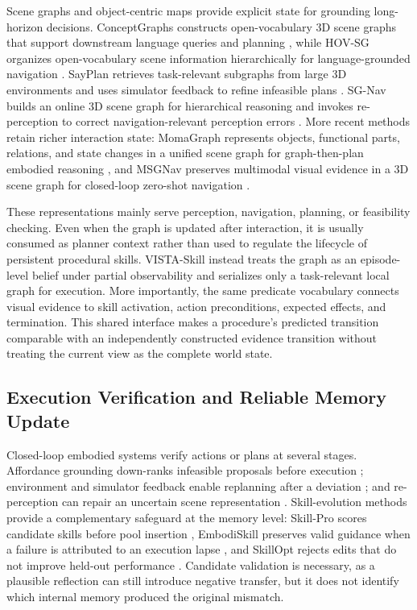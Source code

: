Scene graphs and object-centric maps provide explicit state for grounding long-horizon decisions. ConceptGraphs constructs open-vocabulary 3D scene graphs that support downstream language queries and planning \cite{guConceptGraphsOpenVocabulary3D2024}, while HOV-SG organizes open-vocabulary scene information hierarchically for language-grounded navigation \cite{werbyHierarchicalOpenVocabulary3D2024}. SayPlan retrieves task-relevant subgraphs from large 3D environments and uses simulator feedback to refine infeasible plans \cite{ranaSayPlanGroundingLarge2023}. SG-Nav builds an online 3D scene graph for hierarchical reasoning and invokes re-perception to correct navigation-relevant perception errors \cite{yinSGNavOnline3D2024}. More recent methods retain richer interaction state: MomaGraph represents objects, functional parts, relations, and state changes in a unified scene graph for graph-then-plan embodied reasoning \cite{juMomaGraphStateAwareUnified2026}, and MSGNav preserves multimodal visual evidence in a 3D scene graph for closed-loop zero-shot navigation \cite{huangMSGNavUnleashingPower2026}.

These representations mainly serve perception, navigation, planning, or feasibility checking. Even when the graph is updated after interaction, it is usually consumed as planner context rather than used to regulate the lifecycle of persistent procedural skills. VISTA-Skill instead treats the graph as an episode-level belief under partial observability and serializes only a task-relevant local graph for execution. More importantly, the same predicate vocabulary connects visual evidence to skill activation, action preconditions, expected effects, and termination. This shared interface makes a procedure's predicted transition comparable with an independently constructed evidence transition without treating the current view as the complete world state.

\subsection{Execution Verification and Reliable Memory Update}

Closed-loop embodied systems verify actions or plans at several stages. Affordance grounding down-ranks infeasible proposals before execution \cite{ichterCanNotSay2023}; environment and simulator feedback enable replanning after a deviation \cite{huangInnerMonologueEmbodied2023,ranaSayPlanGroundingLarge2023}; and re-perception can repair an uncertain scene representation \cite{yinSGNavOnline3D2024}. Skill-evolution methods provide a complementary safeguard at the memory level: Skill-Pro scores candidate skills before pool insertion \cite{miSkillProLearningReusable2026}, EmbodiSkill preserves valid guidance when a failure is attributed to an execution lapse \cite{juEmbodiSkillSkillAwareReflection2026}, and SkillOpt rejects edits that do not improve held-out performance \cite{yangSkillOptExecutiveStrategy2026}. Candidate validation is necessary, as a plausible reflection can still introduce negative transfer, but it does not identify which internal memory produced the original mismatch.

